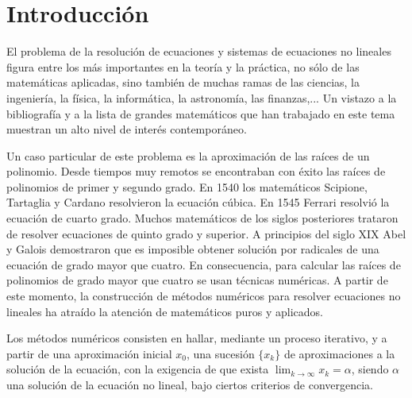 

\chapter{Introducción}
El problema de la resolución de ecuaciones y sistemas de ecuaciones no lineales figura entre los más importantes en la teoría y la práctica, no sólo de las matemáticas aplicadas, sino también de muchas ramas de las ciencias, la ingeniería, la física, la informática, la astronomía, las finanzas,... Un vistazo a la bibliografía y a la lista de grandes matemáticos que han trabajado en este tema muestran un alto nivel de interés contemporáneo.

Un caso particular de este problema es la aproximación de las raíces de un polinomio. Desde tiempos muy remotos se encontraban con éxito las raíces de polinomios de primer y segundo grado. En 1540 los matemáticos Scipione, Tartaglia y Cardano resolvieron la ecuación cúbica. En 1545 Ferrari resolvió la ecuación de cuarto grado. Muchos matemáticos de los siglos posteriores trataron de resolver ecuaciones de quinto grado y superior. A principios del siglo XIX Abel y Galois demostraron que es imposible obtener solución por radicales de una
ecuación de grado mayor que cuatro. En consecuencia, para calcular las raíces de polinomios de grado mayor que cuatro se usan técnicas numéricas. A partir de este momento, la construcción de métodos numéricos para resolver ecuaciones no lineales ha atraído la atención de matemáticos puros y aplicados.

Los métodos numéricos consisten en hallar, mediante un proceso iterativo, y a partir de una aproximación inicial $\displaystyle x_0$, una sucesión $\displaystyle \{x_k\}$ de aproximaciones a la solución de la ecuación, con la exigencia de que exista
$\displaystyle \lim_{k \rightarrow \infty} x_k=\alpha$, siendo $\alpha$ una solución de la ecuación no lineal, bajo ciertos criterios de convergencia. 


